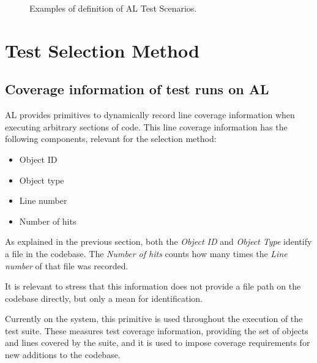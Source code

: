 \documentclass{article}
\begin{document}
\begin{figure}[H]
  \centering
  \qquad
  \caption{Examples of definition of AL Test Scenarios. }
  \label{fig:al-test-examples}
\end{figure}


\section{Test Selection Method}
\subsection{Coverage information of test runs on AL}\label{section:cov-info}
AL provides primitives to dynamically record line coverage information when executing arbitrary sections of code. This line coverage information has the following components, relevant for the selection method:
\begin{itemize}
\item Object ID
\item Object type
\item Line number
\item Number of hits
\end{itemize}

As explained in the previous section, both the \emph{Object ID} and \emph{Object Type} identify a file in the codebase. The \emph{Number of hits} counts how many times the \emph{Line number} of that file was recorded.

It is relevant to stress that this information does not provide a file path on the codebase directly, but only a mean for identification.

Currently on the system, this primitive is used throughout the execution of the test suite. These measures test coverage information, providing the set of objects and lines covered by the suite, and it is used to impose coverage requirements for new additions to the codebase.
\end{document}
